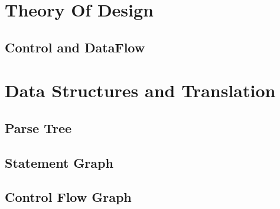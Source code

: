 \documentclass[10pt]{article}
\begin{document}
\section{Theory Of Design}

\subsection{Control and DataFlow}

\section{Data Structures and Translation}

\subsection{Parse Tree}

\subsection{Statement Graph} 

\subsection{Control Flow Graph}



\end{document}
